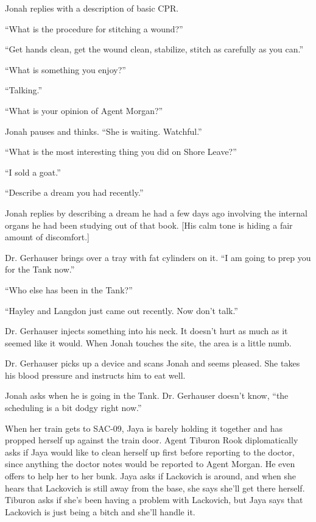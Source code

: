 Jonah replies with a description of basic CPR.

``What is the procedure for stitching a wound?''

``Get hands clean, get the wound clean, stabilize, stitch as carefully as you can.''

``What is something you enjoy?''

``Talking.''

``What is your opinion of Agent Morgan?''

Jonah pauses and thinks.  ``She is waiting.  Watchful.''

``What is the most interesting thing you did on Shore Leave?''

``I sold a goat.''

``Describe a dream you had recently.''  

Jonah replies by describing a dream he had a few days ago involving the internal organs he had been studying out of that book.  {[}His calm tone is hiding a fair amount of discomfort.{]}



Dr. Gerhauser brings over a tray with fat cylinders on it.  ``I am going to prep you for the Tank now.''

``Who else has been in the Tank?''

``Hayley and Langdon just came out recently.  Now don't talk.''

Dr. Gerhauser injects something into his neck.  It doesn't hurt as much as it seemed like it would.  When Jonah touches the site, the area is a little numb.



Dr. Gerhauser picks up a device and scans Jonah and seems pleased. She takes his blood pressure and instructs him to eat well.



Jonah asks when he is going in the Tank.  Dr. Gerhauser doesn't know, ``the scheduling is a bit dodgy right now.''



When her train gets to SAC-09, Jaya is barely holding it together and has propped herself up against the train door.  Agent Tiburon Rook diplomatically asks if Jaya would like to clean herself up first before reporting to the doctor, since anything the doctor notes would be reported to Agent Morgan.  He even offers to help her to her bunk. Jaya asks if Lackovich is around, and when she hears that Lackovich is still away from the base, she says she'll get there herself.  Tiburon asks if she's been having a problem with Lackovich, but Jaya says that Lackovich is just being a bitch and she'll handle it.  




